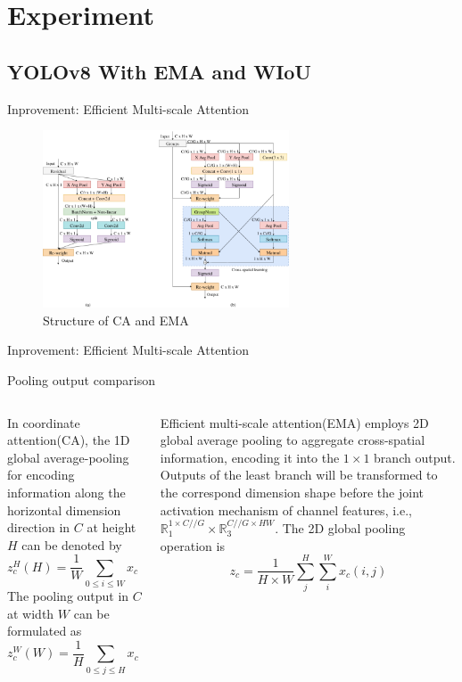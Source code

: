\section{Experiment}

\subsection{YOLOv8 With EMA and WIoU}
\begin{frame}{Inprovement: Efficient Multi-scale Attention}
	\begin{figure}[h]
		\centering
		\includegraphics[width=0.65\textwidth]{images/ca_ema.png}
		\caption{Structure of CA and EMA}
		\label{fig:ca_ema}
	\end{figure}
\end{frame}



\begin{frame}{Inprovement: Efficient Multi-scale Attention}
	\begin{block}{Pooling output comparison}
		\begin{columns}
			\begin{column}{0.4\textwidth}
				In coordinate attention(CA), the 1D global average-pooling for encoding information along the horizontal dimension direction in $C$ at height $H$ can be denoted by
				\begin{equation}
					z^H_c(H)=\frac{1}{W}\sum_{0\leq i\leq W} x_c(H,i)
				\end{equation}
				The pooling output in $C$ at width $W$ can be formulated as
				\begin{equation}
					z^W_c(W)=\frac{1}{H}\sum_{0\leq j\leq H}x_c(j,W)
				\end{equation}
			\end{column}
			\begin{column}{0.4\textwidth}
				Efficient multi-scale attention(EMA) employs 2D global average pooling to aggregate cross-spatial information, encoding it into the $1\times 1$ branch output. Outputs of the least branch will be transformed to the correspond dimension shape before the joint activation mechanism of channel features, i.e., $\mathbb{R}^{1\times C//G}_1\times \mathbb{R}^{C//G\times HW}_3$. The 2D global pooling operation is
				\begin{equation}
					z_c=\frac{1}{H\times W}\sum^H_j\sum^W_i x_c(i,j)
				\end{equation}
			\end{column}
		\end{columns}
	\end{block}
\end{frame}

